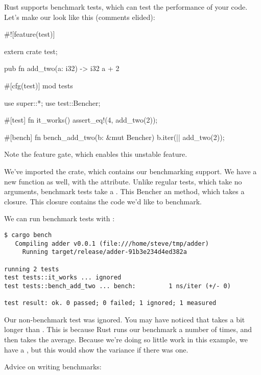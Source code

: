 Rust supports benchmark tests, which can test the performance of your code. Let's make our  look like 
this (comments elided):

\begin{rustc}
#![feature(test)]

extern crate test;

pub fn add_two(a: i32) -> i32 {
    a + 2
}

#[cfg(test)]
mod tests {
    use super::*;
    use test::Bencher;

    #[test]
    fn it_works() {
        assert_eq!(4, add_two(2));
    }

    #[bench]
    fn bench_add_two(b: &mut Bencher) {
        b.iter(|| add_two(2));
    }
}
\end{rustc}

Note the  feature gate, which enables this unstable feature.

\blank

We've imported the  crate, which contains our benchmarking support. We have a new function as well, with the 
 attribute. Unlike regular tests, which take no arguments, benchmark tests take a . This 
Bencher  an  method, which takes a closure. This closure contains the code we'd like to benchmark.

\blank

We can run benchmark tests with :

\begin{verbatim}
$ cargo bench
   Compiling adder v0.0.1 (file:///home/steve/tmp/adder)
     Running target/release/adder-91b3e234d4ed382a

running 2 tests
test tests::it_works ... ignored
test tests::bench_add_two ... bench:         1 ns/iter (+/- 0)

test result: ok. 0 passed; 0 failed; 1 ignored; 1 measured
\end{verbatim}

Our non-benchmark test was ignored. You may have noticed that  takes a bit longer than . 
This is because Rust runs our benchmark a number of times, and then takes the average. Because we're doing so little work in 
this example, we have a , but this would show the variance if there was one.

\blank

Advice on writing benchmarks:

